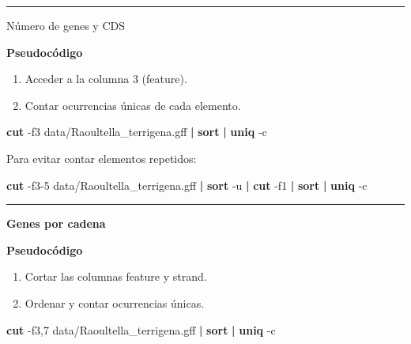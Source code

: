 \documentclass[
]{book}
\newenvironment{Shaded}{\begin{snugshade}}{\end{snugshade}}
\newcommand{\AttributeTok}[1]{\textcolor[rgb]{0.13,0.29,0.53}{#1}}
\newcommand{\FunctionTok}[1]{\textcolor[rgb]{0.13,0.29,0.53}{\textbf{#1}}}
\newcommand{\KeywordTok}[1]{\textcolor[rgb]{0.13,0.29,0.53}{\textbf{#1}}}
\newcommand{\NormalTok}[1]{#1}
\begin{document}
\begin{center}\rule{0.5\linewidth}{0.5pt}\end{center}

Número de genes y CDS

\textbf{Pseudocódigo}

\begin{enumerate}
\def\labelenumi{\arabic{enumi}.}
\item
  Acceder a la columna 3 (feature).
\item
  Contar ocurrencias únicas de cada elemento.
\end{enumerate}

\begin{Shaded}
\begin{Highlighting}[]
\FunctionTok{cut} \AttributeTok{{-}f3}\NormalTok{ data/Raoultella\_terrigena.gff }\KeywordTok{|} \FunctionTok{sort} \KeywordTok{|} \FunctionTok{uniq} \AttributeTok{{-}c}
\end{Highlighting}
\end{Shaded}

Para evitar contar elementos repetidos:

\begin{Shaded}
\begin{Highlighting}[]
\FunctionTok{cut} \AttributeTok{{-}f3{-}5}\NormalTok{ data/Raoultella\_terrigena.gff }\KeywordTok{|} \FunctionTok{sort} \AttributeTok{{-}u} \KeywordTok{|} \FunctionTok{cut} \AttributeTok{{-}f1} \KeywordTok{|} \FunctionTok{sort} \KeywordTok{|} \FunctionTok{uniq} \AttributeTok{{-}c}
\end{Highlighting}
\end{Shaded}

\begin{center}\rule{0.5\linewidth}{0.5pt}\end{center}

\textbf{Genes por cadena}

\textbf{Pseudocódigo}

\begin{enumerate}
\def\labelenumi{\arabic{enumi}.}
\item
  Cortar las columnas feature y strand.
\item
  Ordenar y contar ocurrencias únicas.
\end{enumerate}

\begin{Shaded}
\begin{Highlighting}[]
\FunctionTok{cut} \AttributeTok{{-}f3,7}\NormalTok{ data/Raoultella\_terrigena.gff }\KeywordTok{|} \FunctionTok{sort} \KeywordTok{|} \FunctionTok{uniq} \AttributeTok{{-}c}
\end{Highlighting}
\end{Shaded}
\end{document}
